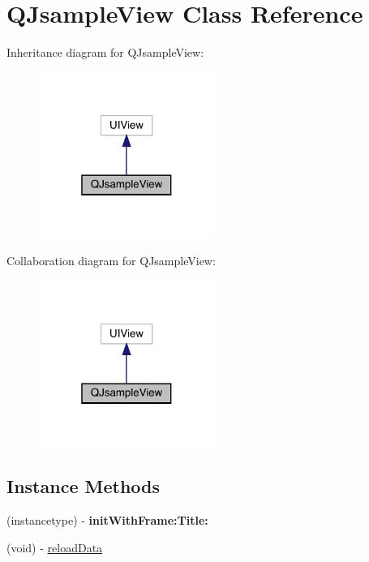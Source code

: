\hypertarget{interface_q_jsample_view}{}\section{Q\+Jsample\+View Class Reference}
\label{interface_q_jsample_view}


Inheritance diagram for Q\+Jsample\+View\+:\nopagebreak
\begin{figure}[H]
\begin{center}
\leavevmode
\includegraphics[width=163pt]{interface_q_jsample_view__inherit__graph}
\end{center}
\end{figure}


Collaboration diagram for Q\+Jsample\+View\+:\nopagebreak
\begin{figure}[H]
\begin{center}
\leavevmode
\includegraphics[width=163pt]{interface_q_jsample_view__coll__graph}
\end{center}
\end{figure}
\subsection*{Instance Methods}
\begin{DoxyCompactItemize}
\item 
\mbox{\label{interface_q_jsample_view_aba278695a5f03970897b7dfb1186653b}} 
(instancetype) -\/ {\bfseries init\+With\+Frame\+:\+Title\+:}
\item 
(void) -\/ \mbox{\hyperlink{interface_q_jsample_view_a06548fa44351318d09c188c84c6942f8}{reload\+Data}}
\end{DoxyCompactItemize}
